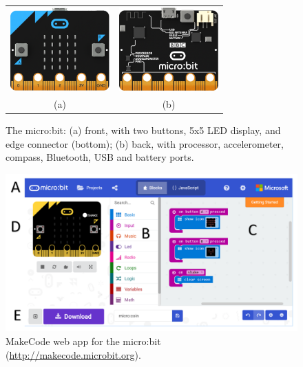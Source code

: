 


\begin{figure}
  \begin{tabular}{cc}
    \includegraphics[width=1.5in]{images/microbit-front.png} &
    \includegraphics[width=1.5in]{images/microbit-back.png} \\
    (a) & (b)
  \end{tabular}
  \caption{\label{fig:microbit}The micro:bit: (a) front, with two buttons,
    5x5 LED display, and edge connector (bottom); (b) back, with processor, accelerometer, compass, Bluetooth, USB and battery ports.}
  \end{figure}

  \begin{figure}[t]
    \includegraphics[width=6in]{images/webApp.png}
    \caption{\label{fig:snapshot}MakeCode web app for the micro:bit (\url{http://makecode.microbit.org}).}
  \end{figure}

